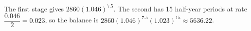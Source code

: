 The first stage gives $ 2860(1.046)^{7.5}$. The second has 15 half-year periods at rate $\dfrac{0.046}{2}=0.023 $, so the balance is $ 2860(1.046)^{7.5}(1.023)^{15}\approx\boxed{5636.22}$.
